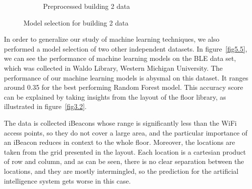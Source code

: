 \documentclass[a4paper,singleside,12pt]{report} %
\begin{document}
\begin{figure}[!htb]
\begin{subfigure}[b]{0.48\linewidth}
			    \caption{Preprocessed building 2 data}
			  \end{subfigure}
			  \caption{Model selection for building 2 data}
			  \label{fig5.4}
			\end{figure} 
			
			In order to generalize our study of machine learning techniques, we also performed a model selection of two other independent datasets. 
			In figure~\ref{fig5.5}, we can see the performance of machine learning models on the BLE data set, which was collected in Waldo Library, Western Michigan University. 
			The performance of our machine learning models is abysmal on this dataset. 
			It ranges around 0.35 for the best performing Random Forest model.  
			This accuracy score can be explained by taking insights from the layout of the floor library, as illustrated in figure~\ref{fig3.2}. 
			
			The data is collected iBeacons whose range is significantly less than the WiFi access points, so they do not cover a large area, and the particular importance of an iBeacon reduces in context to the whole floor.
			Moreover, the locations are taken from the grid presented in the layout.
			Each location is a cartesian product of row and column, and as can be seen, there is no clear separation between the locations, and they are mostly intermingled, so the prediction for the artificial intelligence system gets worse in this case.
			
\end{document}
